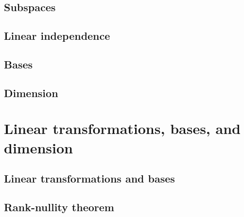 \documentclass[handout,envcountsect,hyperref={colorlinks},notheorems]{beamer}
\theoremstyle{definition}
\theoremstyle{named}
\numberwithin{myalgctr}{section}
\begin{document}
\subsection{Subspaces}\label{ss:subspace}

\subsection{Linear independence}\label{ss:independence}

\subsection{Bases}\label{ss:basis}

\subsection{Dimension}\label{ss:dimension}


\section{Linear transformations, bases, and dimension}\label{s:transbasis}
\subsection{Linear transformations and bases}\label{ss:rank-nullity}

\subsection{Rank-nullity theorem}\label{ss:rank-nullity}

\end{document}
